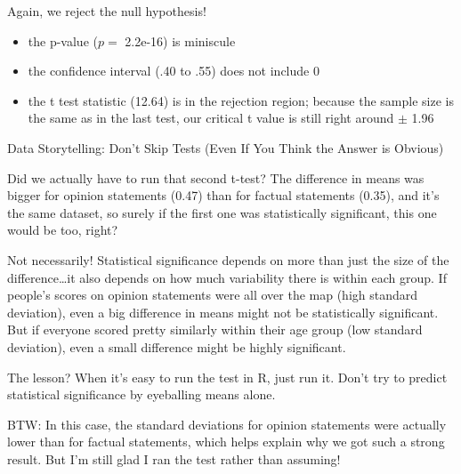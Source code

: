 \documentclass[
  letterpaper,
]{book}
\providecommand{\tightlist}{%
  \setlength{\itemsep}{0pt}\setlength{\parskip}{0pt}}\usepackage{longtable,booktabs,array}
\begin{document}
Again, we reject the null hypothesis!

\begin{itemize}
\tightlist
\item
  the p-value (\(p=\) 2.2e-16) is miniscule
\item
  the confidence interval (.40 to .55) does not include 0
\item
  the t test statistic (12.64) is in the rejection region; because the
  sample size is the same as in the last test, our critical t value is
  still right around \(\pm\) 1.96
\end{itemize}

\begin{tcolorbox}[enhanced jigsaw, colframe=quarto-callout-tip-color-frame, breakable, arc=.35mm, bottomtitle=1mm, bottomrule=.15mm, colbacktitle=quarto-callout-tip-color!10!white, rightrule=.15mm, colback=white, opacityback=0, opacitybacktitle=0.6, coltitle=black, left=2mm, toptitle=1mm, toprule=.15mm, titlerule=0mm, leftrule=.75mm, title=\textcolor{quarto-callout-tip-color}{\faLightbulb}\hspace{0.5em}{Tip}]

Data Storytelling: Don't Skip Tests (Even If You Think the Answer is
Obvious)

Did we actually have to run that second t-test? The difference in means
was bigger for opinion statements (0.47) than for factual statements
(0.35), and it's the same dataset, so surely if the first one was
statistically significant, this one would be too, right?

Not necessarily! Statistical significance depends on more than just the
size of the difference\ldots it also depends on how much variability
there is within each group. If people's scores on opinion statements
were all over the map (high standard deviation), even a big difference
in means might not be statistically significant. But if everyone scored
pretty similarly within their age group (low standard deviation), even a
small difference might be highly significant.

The lesson? When it's easy to run the test in R, just run it. Don't try
to predict statistical significance by eyeballing means alone.

BTW: In this case, the standard deviations for opinion statements were
actually lower than for factual statements, which helps explain why we
got such a strong result. But I'm still glad I ran the test rather than
assuming!

\end{tcolorbox}
\end{document}
